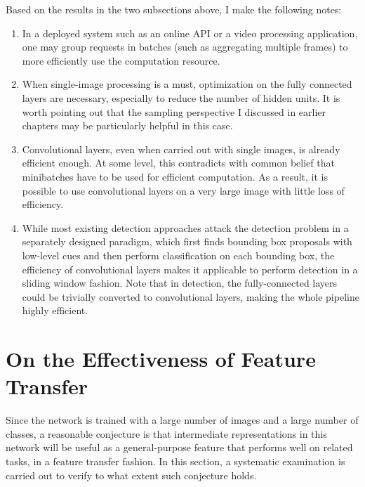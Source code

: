 Based on the results in the two subsections above, I make the following notes:
\begin{enumerate}
  \item In a deployed system such as an online API or a video processing application, one may group requests in batches (such as aggregating multiple frames) to more efficiently use the computation resource.
  \item When single-image processing is a must, optimization on the fully connected layers are necessary, especially to reduce the number of hidden units. It is worth pointing out that the \nystrom sampling perspective I discussed in earlier chapters may be particularly helpful in this case.
  \item Convolutional layers, even when carried out with single images, is already efficient enough. At some level, this contradicts with common belief that minibatches have to be used for efficient computation. As a result, it is possible to use convolutional layers on a very large image with little loss of efficiency.
  \item While most existing detection approaches attack the detection problem in a separately designed paradigm, which first finds bounding box proposals with low-level cues and then perform classification on each bounding box, the efficiency of convolutional layers makes it applicable to perform detection in a sliding window fashion. Note that in detection, the fully-connected layers could be trivially converted to convolutional layers, making the whole pipeline highly efficient.
\end{enumerate}

\section{On the Effectiveness of Feature Transfer}
Since the network is trained with a large number of images and a large number of classes, a reasonable conjecture is that intermediate representations in this network will be useful as a general-purpose feature that performs well on related tasks, in a feature transfer fashion. In this section, a systematic examination is carried out to verify to what extent such conjecture holds.

